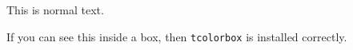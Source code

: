 \documentclass{article}
\begin{document}
This is normal text.

\begin{tcolorbox}
If you can see this inside a box, then \texttt{tcolorbox} is installed correctly.
\end{tcolorbox}
\end{document}
